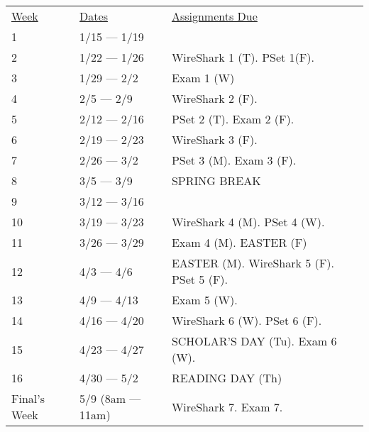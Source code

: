 \documentclass[10pt]{article}
\begin{document}
\begin{center}
\begin{tabular}{lll}
\underline{Week} & \underline{Dates} & \underline{Assignments Due}  \\
1 & 1/15 --- 1/19 &  \\
2 & 1/22 --- 1/26 & WireShark 1 (T). PSet 1(F). \\
3 & 1/29 --- 2/2 & Exam 1 (W)  \\
4 & 2/5 --- 2/9 & WireShark 2 (F).\\
5 & 2/12 --- 2/16 &  PSet 2 (T). Exam 2 (F). \\
6 & 2/19 --- 2/23 & WireShark 3 (F).  \\
7 & 2/26 --- 3/2 &  PSet 3 (M). Exam 3 (F).   \\
8 & 3/5 --- 3/9 & SPRING BREAK \\
9 & 3/12 --- 3/16 &   \\
10 & 3/19 --- 3/23 & WireShark 4 (M). PSet 4 (W). \\
11 & 3/26 --- 3/29 & Exam 4 (M). EASTER (F)    \\
12 & 4/3 --- 4/6 & EASTER (M). WireShark 5 (F). PSet 5 (F).   \\
13 & 4/9 --- 4/13 &  Exam 5 (W).  \\
14 & 4/16 --- 4/20 &  WireShark 6 (W). PSet 6 (F). \\
15 & 4/23 --- 4/27 & SCHOLAR'S DAY (Tu).  Exam 6 (W).   \\
16 & 4/30 --- 5/2 & READING DAY (Th)  \\
Final's Week & 5/9 (8am --- 11am) & WireShark 7. Exam 7.    \\
\end{tabular}
\end{center}
\end{document}
